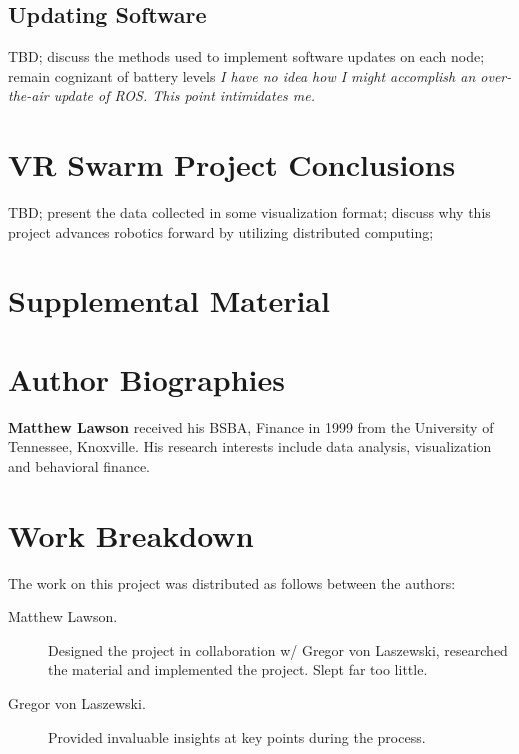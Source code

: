 \documentclass[9pt,twocolumn,twoside]{../../styles/osajnl}
\begin{document}
\subsection{Updating Software}
TBD; discuss the methods used to implement software updates on each node; remain cognizant of battery levels
\textit{I have no idea how I might accomplish an over-the-air update of ROS.  This point intimidates me.}

\section{VR Swarm Project Conclusions}
TBD; present the data collected in some visualization format; discuss why this project advances robotics forward by utilizing distributed computing;

\section{Supplemental Material}



 
\section*{Author Biographies}
\begingroup
\setlength\intextsep{0pt}
\begin{minipage}[t][3.2cm][t]{1.0\columnwidth} %
  \noindent
  {\bfseries Matthew Lawson} received his BSBA, Finance in 1999 from
  the University of Tennessee, Knoxville. His research interests include
  data analysis, visualization and behavioral finance.
\end{minipage}
\endgroup

\appendix

\section{Work Breakdown}

The work on this project was distributed as follows between the
authors:


\begin{description}

\item[Matthew Lawson.] Designed the project in collaboration w/ Gregor von Laszewski, researched the material and implemented the project.  Slept far too little.

\item[Gregor von Laszewski.] Provided invaluable insights at key points during the process.

\end{description}
\end{document}
